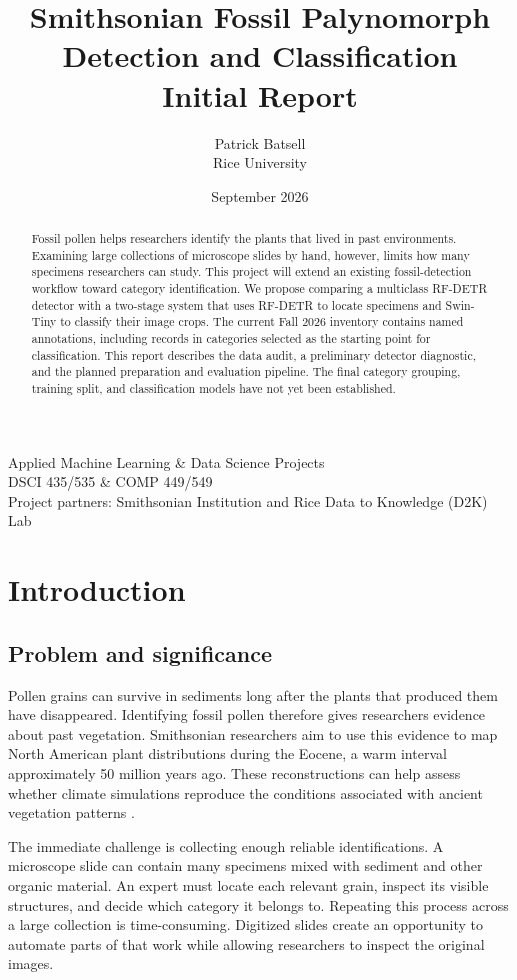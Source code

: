 \documentclass[11pt,letterpaper]{article}
\title{Smithsonian Fossil Palynomorph\\Detection and Classification\\[8pt]\large Initial Report}
\author{Patrick Batsell\\Rice University}
\date{September 2026}
\begin{document}
\maketitle
\vspace{1em}
\begin{abstract}
Fossil pollen helps researchers identify the plants that lived in past environments. Examining large collections of microscope slides by hand, however, limits how many specimens researchers can study. This project will extend an existing fossil-detection workflow toward category identification. We propose comparing a multiclass RF-DETR detector with a two-stage system that uses RF-DETR to locate specimens and Swin-Tiny to classify their image crops. The current Fall 2026 inventory contains \NamedCount{} named annotations, including \YesCount{} records in \YesCategories{} categories selected as the starting point for classification. This report describes the data audit, a preliminary detector diagnostic, and the planned preparation and evaluation pipeline. The final category grouping, training split, and classification models have not yet been established.
\end{abstract}
\vfill
\begin{center}
Applied Machine Learning \& Data Science Projects\\
DSCI 435/535 \& COMP 449/549\\[6pt]
Project partners: Smithsonian Institution and Rice Data to Knowledge (D2K) Lab
\end{center}
\newpage
\tableofcontents
\newpage

\section{Introduction}
\subsection{Problem and significance}
Pollen grains can survive in sediments long after the plants that produced them have disappeared. Identifying fossil pollen therefore gives researchers evidence about past vegetation. Smithsonian researchers aim to use this evidence to map North American plant distributions during the Eocene, a warm interval approximately 50 million years ago. These reconstructions can help assess whether climate simulations reproduce the conditions associated with ancient vegetation patterns \citep{proposal2026}.

The immediate challenge is collecting enough reliable identifications. A microscope slide can contain many specimens mixed with sediment and other organic material. An expert must locate each relevant grain, inspect its visible structures, and decide which category it belongs to. Repeating this process across a large collection is time-consuming. Digitized slides create an opportunity to automate parts of that work while allowing researchers to inspect the original images.
\end{document}
